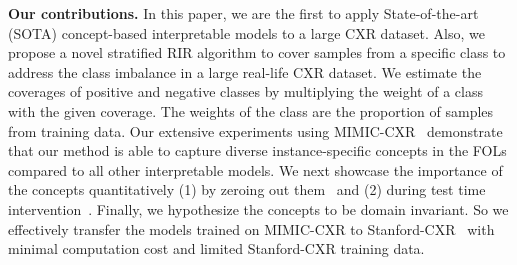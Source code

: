 \textbf{Our contributions.}
 In this paper, we are the first to apply State-of-the-art (SOTA) concept-based interpretable models to a large CXR dataset. Also, we propose a novel stratified RIR algorithm to cover samples from a specific class to address the class imbalance in a large real-life CXR dataset. We estimate the coverages of positive and negative classes by multiplying the weight of a class with the given coverage. The weights of the class are the proportion of samples from training data. Our extensive experiments using MIMIC-CXR~\cite{12_johnsonmimic} demonstrate that our method is able to capture diverse instance-specific concepts in the FOLs compared to all other interpretable models. We next showcase the importance of the concepts quantitatively (1) by zeroing out them~\cite{ghosh2023route} and (2) during test time intervention~\cite{koh2020concept}. Finally, we hypothesize the concepts to be domain invariant. So we effectively transfer the models trained on MIMIC-CXR to Stanford-CXR~\cite{irvin2019chexpert} with minimal computation cost and limited Stanford-CXR training data.



